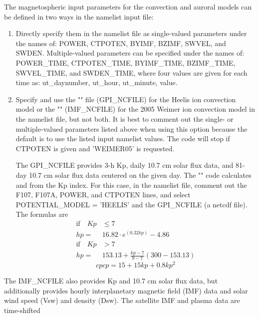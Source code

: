 The magnetospheric input parameters for the convection and auroral models
can be defined in two ways in the namelist input file:
%
\begin{enumerate}
\item Directly specify them in the namelist file as single-valued
parameters under the names of: POWER, CTPOTEN, BYIMF, BZIMF, SWVEL, and SWDEN.
 Multiple-valued parameters can be specified
under the names of: POWER\_TIME, CTPOTEN\_TIME, BYIMF\_TIME, BZIMF\_TIME,
SWVEL\_TIME, and SWDEN\_TIME, where four values are given for each
time as: ut\_daynumber, ut\_hour, ut\_minute, value.
\item Specify and use the "" file (GPI\_NCFILE) for the
Heelis ion convection model or the "" (IMF\_NCFILE) for
the 2005 Weimer ion convection model in the namelist file, but not both.
It is best to comment out the single- or multiple-valued parameters listed
above when using this option because the default is to use the listed
input namelist values.  The code will stop if CTPOTEN is given and
'WEIMER05' is requested.

The GPI\_NCFILE provides 3-h Kp, daily 10.7 cm solar flux data, and 81-day
10.7 cm solar flux data centered on the given day.  The ""
code calculates  and  from the Kp index. For this case,
in the namelist file, comment out the F107, F107A, POWER, and CTPOTEN
lines, and select POTENTIAL\_MODEL = 'HEELIS' and the GPI\_NCFILE (a netcdf file).
The formulas are
 \cite{zhang2008}
%
\begin{equation}
  \begin{split}
      \text{if} \quad Kp&  \leq  7 \\
                     hp =&  16.82 \cdot e^{(0.32 kp)} - 4.86 \\
      \text{if}   \quad Kp &>  7 \\
                     hp =& 153.13 + \frac{kp- 7}{9-7}(300-153.13)
   \end{split}
    \label{eq:maginp_1}
\end{equation}
%
\begin{equation}
  cpcp = 15 + 15 kp + 0.8 kp^2
    \label{eq:maginp_2}
\end{equation}
% 
\end{enumerate}
%
The IMF\_NCFILE also provides Kp and 10.7 cm solar flux data, but additionally
provides hourly interplanetary magnetic field (IMF) data and solar wind speed
(Vsw) and density (Dsw).  The satellite IMF and plasma data are time-shifted
